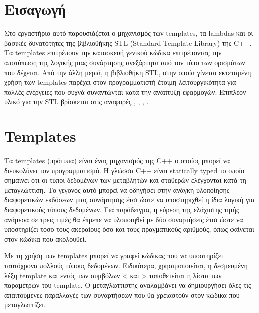 \section{Εισαγωγή}
Στο εργαστήριο αυτό παρουσιάζεται ο μηχανισμός των templates, τα lambdas και οι βασικές δυνατότητες της βιβλιοθήκης STL (Standard Template Library) της C++. Τα templates επιτρέπουν την κατασκευή γενικού κώδικα επιτρέποντας την αποτύπωση της λογικής μιας συνάρτησης ανεξάρτητα από τον τύπο των ορισμάτων που δέχεται. Από την άλλη μεριά, η βιβλιοθήκη STL, στην οποία γίνεται εκτεταμένη χρήση των templates παρέχει στον προγραμματιστή έτοιμη λειτουργικότητα για πολλές ενέργειες που συχνά συναντώνται κατά την ανάπτυξη εφαρμογών. Επιπλέον υλικό για την STL βρίσκεται στις αναφορές \cite{geeks4geeks_stl}, \cite{topcoder_stl1}, \cite{topcoder_stl2}, \cite{hackerearth_stl}. 


\section{Templates}
Τα templates (πρότυπα) είναι ένας μηχανισμός της C++ ο οποίος μπορεί να διευκολύνει τον προγραμματισμό. Η γλώσσα C++ είναι statically typed το οποίο σημαίνει ότι οι τύποι δεδομένων των μεταβλητών και σταθερών ελέγχονται κατά τη μεταγλώττιση. Το γεγονός αυτό μπορεί να οδηγήσει στην ανάγκη υλοποίησης διαφορετικών εκδόσεων μιας συνάρτησης έτσι ώστε να υποστηριχθεί η ίδια λογική για διαφορετικούς τύπους δεδομένων. Για παράδειγμα, η εύρεση της ελάχιστης τιμής ανάμεσα σε τρεις τιμές θα έπρεπε να υλοποιηθεί με δύο συναρτήσεις έτσι ώστε να υποστηρίζει τόσο τους ακεραίους όσο και τους πραγματικούς αριθμούς, όπως φαίνεται στον κώδικα που ακολουθεί.





Με τη χρήση των templates μπορεί να γραφεί κώδικας που να υποστηρίζει ταυτόχρονα πολλούς τύπους δεδομένων.  Ειδικότερα, χρησιμοποιείται, η δεσμευμένη λέξη template και εντός των συμβόλων < και > τοποθετείται η λίστα των παραμέτρων του template. Ο μεταγλωττιστής αναλαμβάνει να δημιουργήσει όλες τις απαιτούμενες παραλλαγές των συναρτήσεων που θα χρειαστούν στον κώδικα που μεταγλωττίζει.





